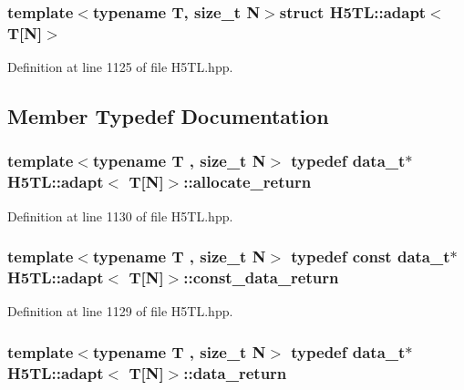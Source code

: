 \subsubsection*{template$<$typename T, size\-\_\-t N$>$struct H5\-T\-L\-::adapt$<$ T\mbox{[}\-N\mbox{]}$>$}



Definition at line 1125 of file H5\-T\-L.\-hpp.



\subsection{Member Typedef Documentation}
\hypertarget{struct_h5_t_l_1_1adapt_3_01_t[_n]_4_a0b70e9265935053f7cd15dd9ae47b5e9}{
\subsubsection[{allocate\-\_\-return}]{\setlength{\rightskip}{0pt plus 5cm}template$<$typename T , size\-\_\-t N$>$ typedef {\bf data\-\_\-t}$\ast$ {\bf H5\-T\-L\-::adapt}$<$ T\mbox{[}N\mbox{]}$>$\-::{\bf allocate\-\_\-return}}}\label{struct_h5_t_l_1_1adapt_3_01_t[_n]_4_a0b70e9265935053f7cd15dd9ae47b5e9}


Definition at line 1130 of file H5\-T\-L.\-hpp.

\hypertarget{struct_h5_t_l_1_1adapt_3_01_t[_n]_4_aa26ab555a2c6ae40181e9212b292e3df}{
\subsubsection[{const\-\_\-data\-\_\-return}]{\setlength{\rightskip}{0pt plus 5cm}template$<$typename T , size\-\_\-t N$>$ typedef const {\bf data\-\_\-t}$\ast$ {\bf H5\-T\-L\-::adapt}$<$ T\mbox{[}N\mbox{]}$>$\-::{\bf const\-\_\-data\-\_\-return}}}\label{struct_h5_t_l_1_1adapt_3_01_t[_n]_4_aa26ab555a2c6ae40181e9212b292e3df}


Definition at line 1129 of file H5\-T\-L.\-hpp.

\hypertarget{struct_h5_t_l_1_1adapt_3_01_t[_n]_4_a255473fbedaa64738ad99c1b2b4e9f33}{
\subsubsection[{data\-\_\-return}]{\setlength{\rightskip}{0pt plus 5cm}template$<$typename T , size\-\_\-t N$>$ typedef {\bf data\-\_\-t}$\ast$ {\bf H5\-T\-L\-::adapt}$<$ T\mbox{[}N\mbox{]}$>$\-::{\bf data\-\_\-return}}}\label{struct_h5_t_l_1_1adapt_3_01_t[_n]_4_a255473fbedaa64738ad99c1b2b4e9f33}


